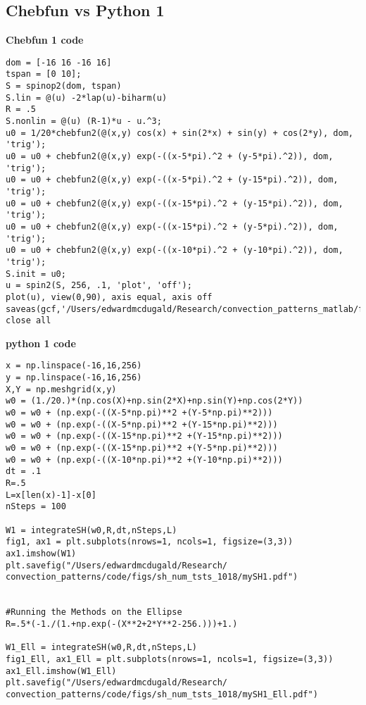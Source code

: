 \documentclass[12pt]{article}
\begin{document}
\subsection{Chebfun vs Python 1}
\textbf{Chebfun 1 code}
\begin{verbatim}
dom = [-16 16 -16 16]
tspan = [0 10];
S = spinop2(dom, tspan)
S.lin = @(u) -2*lap(u)-biharm(u)
R = .5
S.nonlin = @(u) (R-1)*u - u.^3;
u0 = 1/20*chebfun2(@(x,y) cos(x) + sin(2*x) + sin(y) + cos(2*y), dom, 'trig');
u0 = u0 + chebfun2(@(x,y) exp(-((x-5*pi).^2 + (y-5*pi).^2)), dom, 'trig');
u0 = u0 + chebfun2(@(x,y) exp(-((x-5*pi).^2 + (y-15*pi).^2)), dom, 'trig');
u0 = u0 + chebfun2(@(x,y) exp(-((x-15*pi).^2 + (y-15*pi).^2)), dom, 'trig');
u0 = u0 + chebfun2(@(x,y) exp(-((x-15*pi).^2 + (y-5*pi).^2)), dom, 'trig');
u0 = u0 + chebfun2(@(x,y) exp(-((x-10*pi).^2 + (y-10*pi).^2)), dom, 'trig');
S.init = u0;
u = spin2(S, 256, .1, 'plot', 'off');
plot(u), view(0,90), axis equal, axis off
saveas(gcf,'/Users/edwardmcdugald/Research/convection_patterns_matlab/figs/sh_tsts_1018/cf1.pdf');
close all
\end{verbatim}

\textbf{python 1 code}
\begin{verbatim}
x = np.linspace(-16,16,256)
y = np.linspace(-16,16,256)
X,Y = np.meshgrid(x,y)
w0 = (1./20.)*(np.cos(X)+np.sin(2*X)+np.sin(Y)+np.cos(2*Y))
w0 = w0 + (np.exp(-((X-5*np.pi)**2 +(Y-5*np.pi)**2)))
w0 = w0 + (np.exp(-((X-5*np.pi)**2 +(Y-15*np.pi)**2)))
w0 = w0 + (np.exp(-((X-15*np.pi)**2 +(Y-15*np.pi)**2)))
w0 = w0 + (np.exp(-((X-15*np.pi)**2 +(Y-5*np.pi)**2)))
w0 = w0 + (np.exp(-((X-10*np.pi)**2 +(Y-10*np.pi)**2)))
dt = .1
R=.5
L=x[len(x)-1]-x[0]
nSteps = 100

W1 = integrateSH(w0,R,dt,nSteps,L)
fig1, ax1 = plt.subplots(nrows=1, ncols=1, figsize=(3,3))
ax1.imshow(W1)
plt.savefig("/Users/edwardmcdugald/Research/
convection_patterns/code/figs/sh_num_tsts_1018/mySH1.pdf")


#Running the Methods on the Ellipse
R=.5*(-1./(1.+np.exp(-(X**2+2*Y**2-256.)))+1.)

W1_Ell = integrateSH(w0,R,dt,nSteps,L)
fig1_Ell, ax1_Ell = plt.subplots(nrows=1, ncols=1, figsize=(3,3))
ax1_Ell.imshow(W1_Ell)
plt.savefig("/Users/edwardmcdugald/Research/
convection_patterns/code/figs/sh_num_tsts_1018/mySH1_Ell.pdf")
\end{verbatim}
\FloatBarrier

\end{document}
